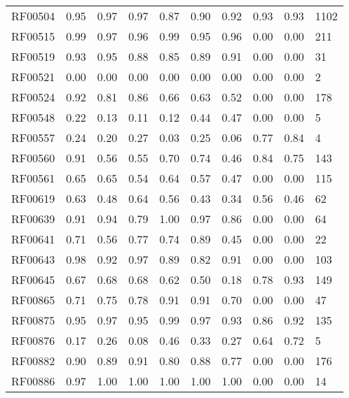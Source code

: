 \begin{tabular}{lrrrrrrrrl}
RF00504      &  0.95 &  0.97 &  0.97 &   0.87 &    0.90 &     0.92 &  0.93 & 0.93 &       1102 \\
RF00515      &  0.99 &  0.97 &  0.96 &   0.99 &    0.95 &     0.96 &  0.00 & 0.00 &        211 \\
RF00519      &  0.93 &  0.95 &  0.88 &   0.85 &    0.89 &     0.91 &  0.00 & 0.00 &         31 \\
RF00521      &  0.00 &  0.00 &  0.00 &   0.00 &    0.00 &     0.00 &  0.00 & 0.00 &          2 \\
RF00524      &  0.92 &  0.81 &  0.86 &   0.66 &    0.63 &     0.52 &  0.00 & 0.00 &        178 \\
RF00548      &  0.22 &  0.13 &  0.11 &   0.12 &    0.44 &     0.47 &  0.00 & 0.00 &          5 \\
RF00557      &  0.24 &  0.20 &  0.27 &   0.03 &    0.25 &     0.06 &  0.77 & 0.84 &          4 \\
RF00560      &  0.91 &  0.56 &  0.55 &   0.70 &    0.74 &     0.46 &  0.84 & 0.75 &        143 \\
RF00561      &  0.65 &  0.65 &  0.54 &   0.64 &    0.57 &     0.47 &  0.00 & 0.00 &        115 \\
RF00619      &  0.63 &  0.48 &  0.64 &   0.56 &    0.43 &     0.34 &  0.56 & 0.46 &         62 \\
RF00639      &  0.91 &  0.94 &  0.79 &   1.00 &    0.97 &     0.86 &  0.00 & 0.00 &         64 \\
RF00641      &  0.71 &  0.56 &  0.77 &   0.74 &    0.89 &     0.45 &  0.00 & 0.00 &         22 \\
RF00643      &  0.98 &  0.92 &  0.97 &   0.89 &    0.82 &     0.91 &  0.00 & 0.00 &        103 \\
RF00645      &  0.67 &  0.68 &  0.68 &   0.62 &    0.50 &     0.18 &  0.78 & 0.93 &        149 \\
RF00865      &  0.71 &  0.75 &  0.78 &   0.91 &    0.91 &     0.70 &  0.00 & 0.00 &         47 \\
RF00875      &  0.95 &  0.97 &  0.95 &   0.99 &    0.97 &     0.93 &  0.86 & 0.92 &        135 \\
RF00876      &  0.17 &  0.26 &  0.08 &   0.46 &    0.33 &     0.27 &  0.64 & 0.72 &          5 \\
RF00882      &  0.90 &  0.89 &  0.91 &   0.80 &    0.88 &     0.77 &  0.00 & 0.00 &        176 \\
RF00886      &  0.97 &  1.00 &  1.00 &   1.00 &    1.00 &     1.00 &  0.00 & 0.00 &         14 \\

\end{tabular}

